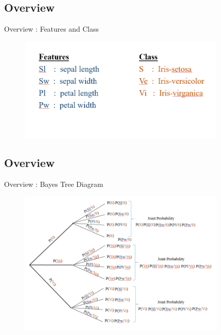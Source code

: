\documentclass{beamer}
\begin{document}
\subsection{Overview}
    \begin{frame}{Overview : Features and Class}
        \begin{center}
            \begin{figure}
                \begin{center}
                    \includegraphics[width = 10cm, height = 5cm]{Theme/images/featuresAndClass.PNG}
                \end{center}
            \end{figure}
        \end{center}
    \end{frame}

\subsection{Overview}
    \begin{frame}{Overview : Bayes Tree Diagram}
        \begin{center}
            \begin{figure}
                \begin{center}
                    \includegraphics[width = 10cm, height = 7cm]{Theme/images/tree.PNG}
                \end{center}
            \end{figure}
        \end{center}
    \end{frame}
\end{document}
